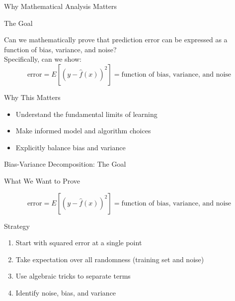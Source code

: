 \documentclass[10pt]{beamer}
\begin{document}
\begin{frame}{Why Mathematical Analysis Matters}
\small

\begin{definitionbox}{The Goal}
\raggedright
Can we mathematically prove that prediction error can be expressed as a function of bias, variance, and noise?\\[1ex]
Specifically, can we show:
$$
\text{error}= E\left[(y - \hat{f}(x))^2\right] = \text{function of bias, variance, and noise}
$$
\end{definitionbox}

\begin{keypointsbox}{Why This Matters}
\raggedright
\begin{itemize}
\item Understand the fundamental limits of learning
\item Make informed model and algorithm choices
\item Explicitly balance bias and variance
\end{itemize}
\end{keypointsbox}


\end{frame}

\begin{frame}{Bias-Variance Decomposition: The Goal}
\small
\begin{definitionbox}{What We Want to Prove}
\raggedright
$$
\text{error}= E\left[(y - \hat{f}(x))^2\right] = \text{function of bias, variance, and noise}
$$
\end{definitionbox}



\begin{keypointsbox}{Strategy}
\raggedright
\begin{enumerate}
\item Start with squared error at a single point
\item Take expectation over all randomness (training set and noise)
\item Use algebraic tricks to separate terms
\item Identify noise, bias, and variance
\end{enumerate}
\end{keypointsbox}
\end{frame}
\end{document}
